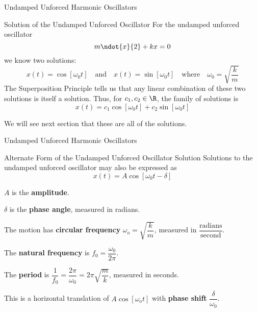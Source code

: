 \documentclass{beamer}
\begin{document}
\begin{frame}{Undamped Unforced Harmonic Oscillators}
\begin{block}{Solution of the Undamped Unforced Oscillator}
For the undamped unforced oscillator
\begin{equation*}
m\ndot{x}{2}+kx=0
\end{equation*}
we know two solutions:
\begin{equation*}
x(t)=\cos[\omega_0 t]
\quad\text{and}\quad
x(t)=\sin[\omega_0 t]
\quad\text{where}\quad
\omega_0=\sqrt{\dfrac{k}{m}}
\end{equation*}\pause
The Superposition Principle tells us that any linear combination of these two solutions is itself a solution. Thus, for $c_1,c_2\in\R$, the family of solutions is
\begin{equation*}
x(t)=c_1\cos[\omega_0 t]+c_2\sin[\omega_0 t]
\end{equation*}
\end{block}\pause
\begin{block}{}
We will see next section that these are all of the solutions.
\end{block}
\end{frame}

\begin{frame}{Undamped Unforced Harmonic Oscillators}
\onslide<+->
\begin{block}{Alternate Form of the Undamped Unforced Oscillator Solution}
Solutions to the undamped unforced oscillator may also be expressed as
\begin{equation*}
x(t)=A\cos[\omega_0 t-\delta]
\end{equation*}

\vspace{-0.5cm}
\begin{dynitemize}[<+- | alert@+>]
\item $A$ is the \textbf{amplitude}.
\item $\delta$ is the \textbf{phase angle}, measured in radians.
\item The motion has \textbf{circular frequency} $\omega_o=\sqrt{\dfrac{k}{m}}$, measured in $\dfrac{\text{radians}}{\text{second}}$.
\item The \textbf{natural frequency} is $f_0=\dfrac{\omega_0}{2\pi}$.
\item The \textbf{period} is $\dfrac{1}{f_0}=\dfrac{2\pi}{\omega_0}=2\pi\sqrt{\dfrac{m}{k}}$, measured in seconds.
\item This is a horizontal translation of $A\cos[\omega_o t]$ with \textbf{phase shift} $\dfrac{\delta}{\omega_0}$.
\end{dynitemize}
\end{block}
\end{frame}
\end{document}

